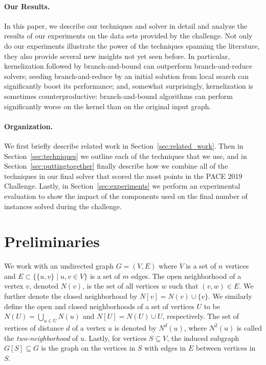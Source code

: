 \documentclass[twoside,leqno,twocolumn]{article}
\newcommand{\csch}[1]{{\color{red} CS: #1}}
\begin{document}
\paragraph*{Our Results.}
In this paper, we describe our techniques and solver in detail and analyze the results of our experiments on the data sets provided by the challenge.
Not only do our experiments illustrate the power of the techniques spanning the literature, they also provide several new insights not yet seen before.
In particular, kernelization followed by branch-and-bound can outperform branch-and-reduce solvers; seeding branch-and-reduce by an initial solution from local search can significantly boost its performance; and, somewhat surprisingly, kernelization is sometimes counterproductive: branch-and-bound algorithms can perform significantly worse on the kernel than on the original input graph.

\paragraph*{Organization.}
We first briefly describe related work in Section~\ref{sec:related_work}. Then in Section~\ref{sec:techniques} we outline each of the techniques that we use, and in Section~\ref{sec:puttingtogether} finally describe how we combine all of the techniques in our final solver that scored the most points in the PACE 2019 Challenge. Lastly, in Section~\ref{sec:experiments} we perform an experimental evaluation to show the impact of the components used on the final number of instances solved during the challenge.

\section{Preliminaries}
\label{sec:preliminaries}
We work with an undirected graph $G = (V,E)$ where $V$ is a set of $n$ vertices and $E\subset \{\{u,v\}\mid u,v\in V\}$ is a set of $m$ edges. The open neighborhood of a vertex $v$, denoted $N(v)$, is the set of all vertices $w$ such that $(v,w)\in E$. We further denote the closed neighborhood by $N[v]=N(v)\cup\{v\}$. We similarly define the open and closed neighborhoods of a set of vertices $U$ to be $N(U) = \bigcup_{u\in U}N(u)$ and $N[U] = N(U) \cup U$, respectively. The set of vertices of distance $d$ of a vertex $u$ is denoted by $N^d(u)$, where $N^2(u)$ is called the \emph{two-neighborhood} of $u$. Lastly, for vertices $S\subseteq V$, the induced subgraph $G[S]\subseteq G$ is the graph on the vertices in $S$ with edges in $E$ between vertices in $S$.
\end{document}
